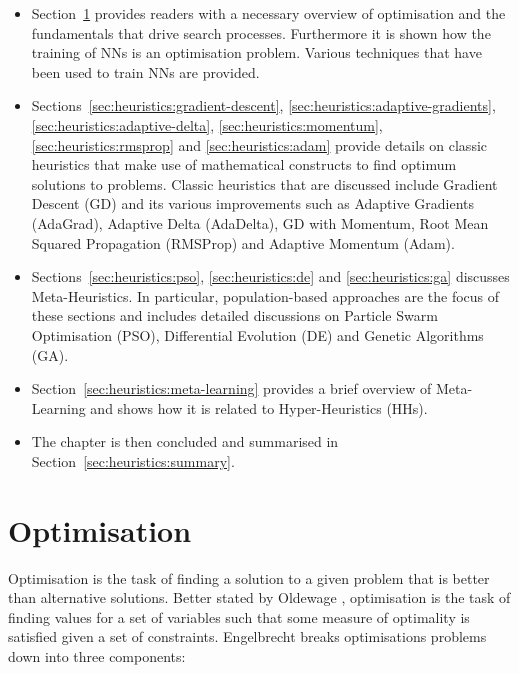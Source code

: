 \begin{itemize}
  \item Section~\ref{sec:heuristics:optimisation} provides readers with a  necessary overview of optimisation and the fundamentals that drive search processes. Furthermore it is shown how the training of NNs is an optimisation problem. Various techniques that have been used to train NNs are provided.
  \item Sections~\ref{sec:heuristics:gradient-descent}, \ref{sec:heuristics:adaptive-gradients}, \ref{sec:heuristics:adaptive-delta}, \ref{sec:heuristics:momentum}, \ref{sec:heuristics:rmsprop} and \ref{sec:heuristics:adam} provide details on classic heuristics that make use of mathematical constructs to find optimum solutions to problems. Classic heuristics that are discussed include Gradient Descent (GD) and its various improvements such as Adaptive Gradients (AdaGrad), Adaptive Delta (AdaDelta), GD with Momentum, Root Mean Squared Propagation (RMSProp) and Adaptive Momentum (Adam).
  \item Sections~\ref{sec:heuristics:pso}, \ref{sec:heuristics:de} and \ref{sec:heuristics:ga} discusses Meta-Heuristics. In particular, population-based approaches are the focus of these sections and includes detailed discussions on Particle Swarm Optimisation (PSO), Differential Evolution (DE) and Genetic Algorithms (GA).
  \item Section~\ref{sec:heuristics:meta-learning} provides a brief overview of Meta-Learning and shows how it is related to Hyper-Heuristics (HHs).
  \item The chapter is then concluded and summarised in Section~\ref{sec:heuristics:summary}.
\end{itemize}


\section{Optimisation}
\label{sec:heuristics:optimisation}

Optimisation is the task of finding a solution to a given problem that is better than alternative solutions. Better stated by Oldewage \cite{ref:oldewage:2017}, optimisation is the task of finding values for a set of variables such that some measure of optimality is satisfied given a set of constraints. Engelbrecht \cite{ref:engelbrecht:2007} breaks optimisations problems down into three components:

